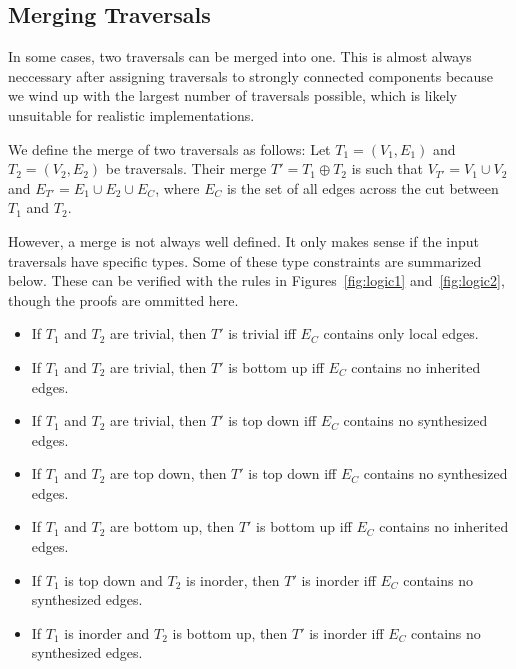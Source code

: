 \documentclass[10pt]{article}
\begin{document}
\subsection{Merging Traversals}
In some cases, two traversals can be merged into one. This is almost always neccessary after assigning traversals to strongly connected components because we wind up with the largest number of traversals possible, which is likely unsuitable for realistic implementations.

We define the merge of two traversals as follows: Let $T_1 = (V_1, E_1)$ and $T_2 = (V_2, E_2)$ be traversals. Their merge $T' = T_1 \oplus T_2$ is such that $V_{T'} = V_1 \cup V_2$ and $E_{T'} = E_1 \cup E_2 \cup E_C$, where $E_C$ is the set of all edges across the cut between $T_1$ and $T_2$.

However, a merge is not always well defined. It only makes sense if the input traversals have specific types. Some of these type constraints are summarized below. These can be verified with the rules in Figures~\ref{fig:logic1} and~\ref{fig:logic2}, though the proofs are ommitted here.
\begin{itemize}
    \item If $T_1$ and $T_2$ are trivial, then $T'$ is trivial iff $E_C$ contains only local edges.
    \item If $T_1$ and $T_2$ are trivial, then $T'$ is bottom up iff $E_C$ contains no inherited edges.
    \item If $T_1$ and $T_2$ are trivial, then $T'$ is top down iff $E_C$ contains no synthesized edges.
    \item If $T_1$ and $T_2$ are top down, then $T'$ is top down iff $E_C$ contains no synthesized edges.
    \item If $T_1$ and $T_2$ are bottom up, then $T'$ is bottom up iff $E_C$ contains no inherited edges.
    \item If $T_1$ is top down and $T_2$ is inorder, then $T'$ is inorder iff $E_C$ contains no synthesized edges.
    \item If $T_1$ is inorder and $T_2$ is bottom up, then $T'$ is inorder iff $E_C$ contains no synthesized edges.

\end{itemize}
\end{document}
